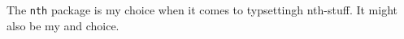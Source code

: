 \documentclass[a5paper]{scrartcl}
\begin{document}
    The \verb+nth+ package is my  choice when it comes to typsettingh
    nth-stuff. It might also be my  and  choice.
\end{document}
